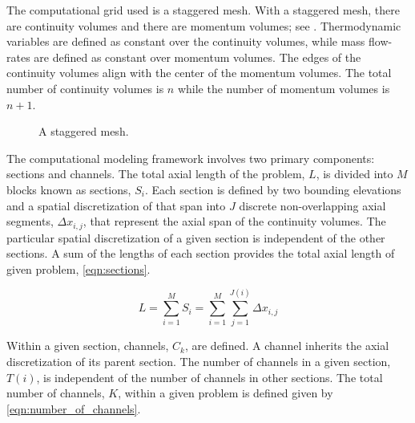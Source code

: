 The computational grid used is a staggered mesh.
With a staggered mesh, there are continuity volumes and there are momentum volumes; see .
Thermodynamic variables are defined as constant over the continuity volumes, while mass flow-rates are defined as constant over momentum volumes.
The edges of the continuity volumes align with the center of the momentum volumes.
The total number of continuity volumes is $n$ while the number of momentum volumes is $n+1$.

\begin{figure}[ht]
\begin{center}
\end{center}
\caption{A staggered mesh.}
\label{fig:staggered_mesh}
\end{figure}

The computational modeling framework involves two primary components: sections and channels.
The total axial length of the problem, $L$, is divided into $M$ blocks known as sections, $S_i$.
Each section is defined by two bounding elevations and a spatial discretization of that span into $J$ discrete non-overlapping axial segments, $\Delta x_{i,j}$, that represent the axial span of the continuity volumes.
The particular spatial discretization of a given section is independent of the other sections.
A sum of the lengths of each section provides the total axial length of given problem, \eqref{eqn:sections}.

\begin{equation}
\label{eqn:sections}
L = \sum_{i=1}^{M} S_i = \sum_{i=1}^{M}\sum_{j=1}^{J(i)} \Delta x_{i,j}
\end{equation}

Within a given section, channels, $C_{k}$, are defined.
A channel inherits the axial discretization of its parent section.
The number of channels in a given section, $T(i)$, is independent of the number of channels in other sections.
The total number of channels, $K$, within a given problem is defined given by \eqref{eqn:number_of_channels}.

